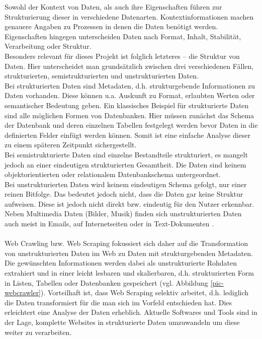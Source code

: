 \documentclass[a4paper,oneside,12pt]{report}
\begin{document}
				Sowohl der Kontext von Daten, als auch ihre Eigenschaften führen zur Strukturierung dieser in verschiedene Datenarten. Kontextinformationen machen genauere Angaben zu Prozessen in denen die Daten benötigt werden. Eigenschaften hingegen unterscheiden Daten nach Format, Inhalt, Stabilität, Verarbeitung oder Struktur.\\
				Besonders relevant für dieses Projekt ist folglich letzteres – die Struktur von Daten. Hier unterscheidet man grundsätzlich zwischen drei verschiedenen Fällen, strukturierten, semistrukturierten und unstrukturierten Daten.
				\\
				Bei strukturierten Daten sind Metadaten, d.h. strukturgebende Informationen zu Daten vorhanden. Diese können u.a. Auskunft zu Format, erlaubten Werten oder semantischer Bedeutung geben. Ein klassisches Beispiel für strukturierte Daten sind alle möglichen Formen von Datenbanken. Hier müssen zunächst das Schema der Datenbank und deren einzelnen Tabellen festgelegt werden bevor Daten in die definierten Felder einfügt werden können. Somit ist eine einfache Analyse dieser zu einem späteren Zeitpunkt sichergestellt.
				\\
				Bei semistrukturierte Daten sind einzelne Bestandteile strukturiert, es mangelt jedoch an einer eindeutigen strukturierten Gesamtheit. Die Daten sind keinem objektorientierten oder relationalem Datenbankschema untergeordnet.
				\\
				Bei unstrukturierten Daten wird keinem eindeutigen Schema gefolgt, nur einer reinen Bitfolge. Das bedeutet jedoch nicht, dass die Daten gar keine Struktur aufweisen. Diese ist jedoch nicht direkt bzw. eindeutig für den Nutzer erkennbar. Neben Multimedia Daten (Bilder, Musik) finden sich unstrukturierten Daten auch meist in Emails, auf Internetseiten oder in Text-Dokumenten \cite{bib-daten}.
				\\
				\\
				Web Crawling bzw. Web Scraping fokussiert sich daher auf die Transformation von unstrukturierten Daten im Web zu Daten mit strukturgebenden Metadaten. Die gewünschten Informationen werden dabei als unstrukturierte Rohdaten extrahiert und in einer leicht lesbaren und skalierbaren, d.h. strukturierten Form in Listen, Tabellen oder Datenbanken gespeichert (vgl. Abbildung \ref{pic-webcrawler}). Vorteilhaft ist, dass Web Scraping selektiv arbeitet, d.h. lediglich die Daten transformiert für die man sich im Vorfeld entschieden hat. Dies erleichtert eine Analyse der Daten erheblich. Aktuelle Softwares und Tools sind in der Lage, komplette Websites in strukturierte Daten umzuwandeln um diese weiter zu verarbeiten.
				
\end{document}
